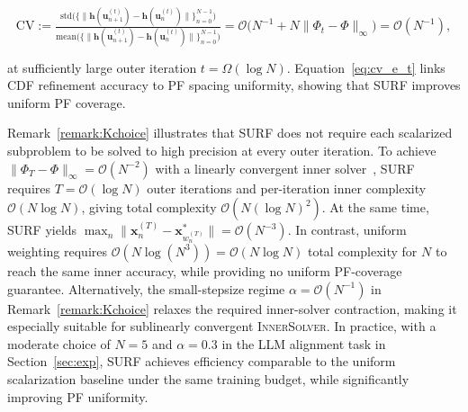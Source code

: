 \documentclass{article}
\newcommand{\Oc}{\mathcal{O}}
\newcommand{\bx}{\mathbf{x}}
\newcommand{\bu}{\mathbf{u}}
\newcommand{\h}{\mathbf{h}}
\newcommand{\Farc}{\Phi}
\begin{document}
\vspace{-0.1cm}
\begin{leftrulebox}
\vspace{-0.1cm}
\begin{equation}\label{eq:cv_e_t}
\text{CV}:=\tfrac{\mathrm{std}\big(\{\|\h(\bu_{n+1}^{(t)})-\h(\bu_{n}^{(t)})\|\}_{n=0}^{N-1} \big)}{\mathrm{mean}\big(\{\|\h(\bu_{n+1}^{(t)})-\h(\bu_{n}^{(t)})\|\}_{n=0}^{N-1} \big)}
=\Oc\big(N^{-1}+N\|\Farc_t-\Farc\|_\infty\big)
=\Oc(N^{-1}),
\end{equation}
\end{leftrulebox}
at sufficiently large outer iteration $t=\Omega(\log N)$. Equation~\eqref{eq:cv_e_t} links CDF refinement accuracy to PF spacing uniformity, showing that SURF improves uniform PF coverage.

Remark~\ref{remark:Kchoice} illustrates that SURF does not require each scalarized subproblem to be solved to high precision at every outer iteration. To achieve $\|\Farc_T-\Farc\|_\infty=\Oc(N^{-2})$ with a linearly convergent inner solver~\cite{fatkhullin2025stochastic}, SURF requires $T=\Oc(\log N)$ outer iterations and per-iteration inner complexity $\Oc(N\log N)$, giving total complexity $\Oc(N(\log N)^2)$. At the same time, SURF yields $\max_n\|\bx_n^{(T)}-\bx_{w_n^{(T)}}^*\|=\Oc(N^{-3})$. In contrast, uniform weighting requires $\Oc(N\log(N^3))=\Oc(N\log N)$ total complexity for $N$ to reach the same inner accuracy, while providing no uniform PF-coverage guarantee. Alternatively, the small-stepsize regime $\alpha=\Oc(N^{-1})$ in Remark~\ref{remark:Kchoice} relaxes the required inner-solver contraction, making it especially suitable for sublinearly convergent \textsc{InnerSolver}.
In practice, with a moderate choice of $N=5$ and $\alpha=0.3$ in the LLM alignment task in Section~\ref{sec:exp}, SURF achieves efficiency comparable to the uniform scalarization baseline under the same training budget, while significantly improving PF uniformity.


\vspace{-0.2cm}
\end{document}
